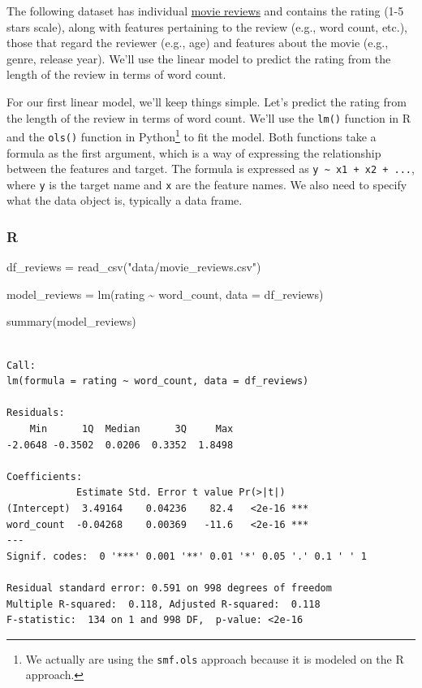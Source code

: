 \documentclass[
  letterpaper,
]{krantz}
\newenvironment{Shaded}{}{}
\newcommand{\AttributeTok}[1]{\textcolor[rgb]{0.49,0.56,0.16}{#1}}
\newcommand{\FunctionTok}[1]{\textcolor[rgb]{0.02,0.16,0.49}{#1}}
\newcommand{\NormalTok}[1]{#1}
\newcommand{\OtherTok}[1]{\textcolor[rgb]{0.00,0.44,0.13}{#1}}
\newcommand{\SpecialCharTok}[1]{\textcolor[rgb]{0.25,0.44,0.63}{#1}}
\newcommand{\StringTok}[1]{\textcolor[rgb]{0.25,0.44,0.63}{#1}}
\begin{document}
The following dataset has individual \hyperref[app-data-review]{movie
reviews} and contains the rating (1-5 stars scale), along with features
pertaining to the review (e.g., word count, etc.), those that regard the
reviewer (e.g., age) and features about the movie (e.g., genre, release
year). We'll use the linear model to predict the rating from the length
of the review in terms of word count.

For our first linear model, we'll keep things simple. Let's predict the
rating from the length of the review in terms of word count. We'll use
the \texttt{lm()} function in R and the \texttt{ols()} function in
Python\footnote{We actually are using the \texttt{smf.ols} approach
  because it is modeled on the R approach.} to fit the model. Both
functions take a formula as the first argument, which is a way of
expressing the relationship between the features and target. The formula
is expressed as \texttt{y\ \textasciitilde{}\ x1\ +\ x2\ +\ ...}, where
\texttt{y} is the target name and \texttt{x} are the feature names. We
also need to specify what the data object is, typically a data frame.

\subsubsection{R}

\begin{Shaded}
\begin{Highlighting}[]
\NormalTok{df\_reviews }\OtherTok{=} \FunctionTok{read\_csv}\NormalTok{(}\StringTok{"data/movie\_reviews.csv"}\NormalTok{)}

\NormalTok{model\_reviews }\OtherTok{=} \FunctionTok{lm}\NormalTok{(rating }\SpecialCharTok{\textasciitilde{}}\NormalTok{ word\_count, }\AttributeTok{data =}\NormalTok{ df\_reviews)}

\FunctionTok{summary}\NormalTok{(model\_reviews)}
\end{Highlighting}
\end{Shaded}

\begin{verbatim}

Call:
lm(formula = rating ~ word_count, data = df_reviews)

Residuals:
    Min      1Q  Median      3Q     Max 
-2.0648 -0.3502  0.0206  0.3352  1.8498 

Coefficients:
            Estimate Std. Error t value Pr(>|t|)    
(Intercept)  3.49164    0.04236    82.4   <2e-16 ***
word_count  -0.04268    0.00369   -11.6   <2e-16 ***
---
Signif. codes:  0 '***' 0.001 '**' 0.01 '*' 0.05 '.' 0.1 ' ' 1

Residual standard error: 0.591 on 998 degrees of freedom
Multiple R-squared:  0.118, Adjusted R-squared:  0.118 
F-statistic:  134 on 1 and 998 DF,  p-value: <2e-16
\end{verbatim}
\end{document}
